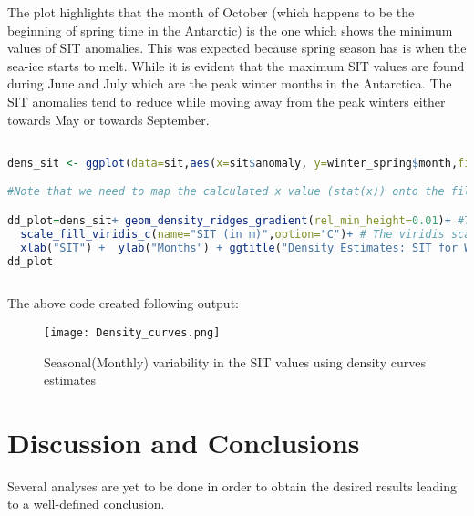 \documentclass{article} %
\begin{document}
\begin{itemize}
    The plot highlights that the month of October (which happens to be the beginning of spring time in the Antarctic) is the one which shows the minimum values of SIT anomalies. This was expected because spring season has is when the sea-ice starts to melt. While it is evident that the maximum SIT values are found during June and July which are the peak winter months in the Antarctica. The SIT anomalies tend to reduce while moving away from the peak winters either towards May or towards September. 
    
\end{itemize}


\begin{lstlisting}[language=R, caption=Plotting seasonal/monthly variability in SIT using Density functions]

dens_sit <- ggplot(data=sit,aes(x=sit$anomaly, y=winter_spring$month,fill=stat(x))) #ggplot() loads in the dataset and assigns values for x and y axes from the dataset entered. fill= is the command used to fill in the values with colours which here are the anomalies.

#Note that we need to map the calculated x value (stat(x)) onto the fill aesthetic, not the original temperature variable. This is the case because geom_density_ridges_gradient calls stat_density_ridges (described in the next section) which calculates new x values as part of its density calculation.

dd_plot=dens_sit+ geom_density_ridges_gradient(rel_min_height=0.01)+ #This function uses density estimates and creates ridge-lines with colour gradients filled with the SIT anomalies in a month. The height represents the the max. peak heights and gaps between the other curves. 
  scale_fill_viridis_c(name="SIT (in m)",option="C")+ # The viridis scales provide colour maps that are perceptually uniform in both colour and black-and-white.The option='C' denotes colour. 
  xlab("SIT") +  ylab("Months") + ggtitle("Density Estimates: SIT for Winter-Spring(2002-2011)")
dd_plot
    
\end{lstlisting}

The above code created following output: 

\begin{figure}[h]
    \centering
    \texttt{[image: Density\_curves.png]}%
    \caption{Seasonal(Monthly) variability in the SIT values using density curves estimates}
    \label{fig:DCurve} %
\end{figure}


\section{Discussion and Conclusions}

Several analyses are yet to be done in order to obtain the desired results leading to a well-defined conclusion.



\end{document}
